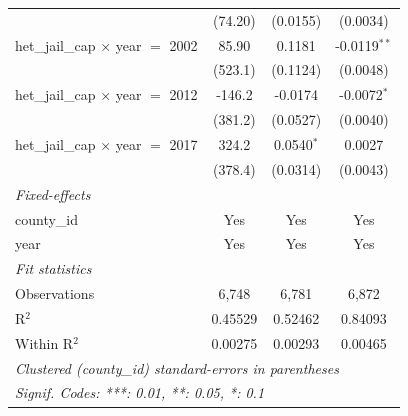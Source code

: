 \begin{tabular}{lccc}
                                                        & (74.20)                          & (0.0155)                     & (0.0034)\\   
   het\_jail\_cap $\times$ year $=$ 2002                & 85.90                            & 0.1181                       & -0.0119$^{**}$\\   
                                                        & (523.1)                          & (0.1124)                     & (0.0048)\\   
   het\_jail\_cap $\times$ year $=$ 2012                & -146.2                           & -0.0174                      & -0.0072$^{*}$\\   
                                                        & (381.2)                          & (0.0527)                     & (0.0040)\\   
   het\_jail\_cap $\times$ year $=$ 2017                & 324.2                            & 0.0540$^{*}$                 & 0.0027\\   
                                                        & (378.4)                          & (0.0314)                     & (0.0043)\\   
   \midrule
   \emph{Fixed-effects}\\
   county\_id                                           & Yes                              & Yes                          & Yes\\  
   year                                                 & Yes                              & Yes                          & Yes\\  
   \midrule
   \emph{Fit statistics}\\
   Observations                                         & 6,748                            & 6,781                        & 6,872\\  
   R$^2$                                                & 0.45529                          & 0.52462                      & 0.84093\\  
   Within R$^2$                                         & 0.00275                          & 0.00293                      & 0.00465\\  
   \midrule \midrule
   \multicolumn{4}{l}{\emph{Clustered (county\_id) standard-errors in parentheses}}\\
   \multicolumn{4}{l}{\emph{Signif. Codes: ***: 0.01, **: 0.05, *: 0.1}}\\
\end{tabular}
\par\endgroup


